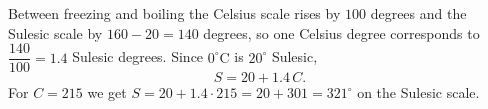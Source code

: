 Between freezing and boiling the Celsius scale rises by $100$ degrees and the Sulesic scale by $160-20=140$ degrees, so one Celsius degree corresponds to $\dfrac{140}{100}=1.4$ Sulesic degrees. Since $0^\circ\text{C}$ is $20^\circ$ Sulesic,
\[
S=20+1.4\,C .
\]
For $C=215$ we get $S=20+1.4\cdot215=20+301=\boxed{321^\circ}$ on the Sulesic scale.
